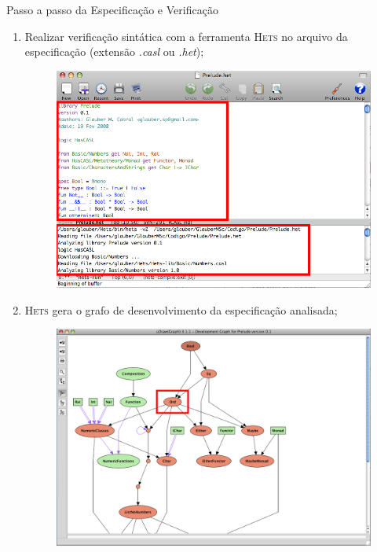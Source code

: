 \documentclass{beamer}
\newcommand{\Hets}{\textsc{Hets}\xspace}
\begin{document}
\begin{frame}[allowframebreaks]{Passo a passo da Especificação e Verificação}

	\begin{enumerate}
		\item Realizar verificação sintática com a ferramenta \Hets no arquivo da especificação (extensão \textit{.casl} ou \textit{.het});
		\begin{figure}
			\includegraphics[height=0.68\textheight]{figuras/passo_a_passo/Picture01.png}
		\end{figure}
		
		\item \Hets gera o grafo de desenvolvimento da especificação analisada;
		\begin{figure}
			\includegraphics[height=0.7\textheight]{figuras/passo_a_passo/Picture02.png}
		\end{figure}
		

\end{enumerate}
\end{frame}
\end{document}
